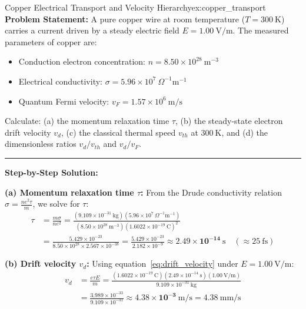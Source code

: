 \documentclass[11pt,a4paper]{article}
\begin{document}
\begin{examplebox}{Copper Electrical Transport and Velocity Hierarchy}{ex:copper_transport}
\textbf{Problem Statement:}
A pure copper wire at room temperature ($T = 300\ \mathrm{K}$) carries a current driven by a steady electric field $E = 1.00\ \mathrm{V/m}$. The measured parameters of copper are:
\begin{itemize}[leftmargin=1.5cm]
    \item Conduction electron concentration: $n = 8.50 \times 10^{28}\ \mathrm{m}^{-3}$
    \item Electrical conductivity: $\sigma = 5.96 \times 10^7\ \Omega^{-1}\mathrm{m}^{-1}$
    \item Quantum Fermi velocity: $v_F = 1.57 \times 10^6\ \mathrm{m/s}$
\end{itemize}
Calculate: (a) the momentum relaxation time $\tau$, (b) the steady-state electron drift velocity $v_d$, (c) the classical thermal speed $v_{th}$ at $300\ \mathrm{K}$, and (d) the dimensionless ratios $v_d / v_{th}$ and $v_d / v_F$.

\vspace{0.2cm}\hrule\vspace{0.2cm}
\textbf{Step-by-Step Solution:}

\textbf{(a) Momentum relaxation time $\tau$:}
From the Drude conductivity relation $\sigma = \frac{n e^2 \tau}{m}$, we solve for $\tau$:
\begin{align*}
\tau &= \frac{m \sigma}{n e^2} = \frac{(9.109 \times 10^{-31}\ \mathrm{kg})(5.96 \times 10^7\ \Omega^{-1}\mathrm{m}^{-1})}{(8.50 \times 10^{28}\ \mathrm{m^{-3}})(1.6022 \times 10^{-19}\ \mathrm{C})^2} \\
&= \frac{5.429 \times 10^{-23}}{8.50 \times 10^{28} \times 2.567 \times 10^{-38}} = \frac{5.429 \times 10^{-23}}{2.182 \times 10^{-9}} \approx \mathbf{2.49 \times 10^{-14}\ \mathrm{s}} \quad (\approx 25\ \mathrm{fs})
\end{align*}

\textbf{(b) Drift velocity $v_d$:}
Using equation~\eqref{eq:drift_velocity} under $E = 1.00\ \mathrm{V/m}$:
\begin{align*}
v_d &= \frac{e \tau E}{m} = \frac{(1.6022 \times 10^{-19}\ \mathrm{C})(2.49 \times 10^{-14}\ \mathrm{s})(1.00\ \mathrm{V/m})}{9.109 \times 10^{-31}\ \mathrm{kg}} \\
&= \frac{3.989 \times 10^{-33}}{9.109 \times 10^{-31}} \approx \mathbf{4.38 \times 10^{-3}\ \mathrm{m/s} = 4.38\ \mathrm{mm/s}}
\end{align*}


\end{examplebox}
\end{document}
